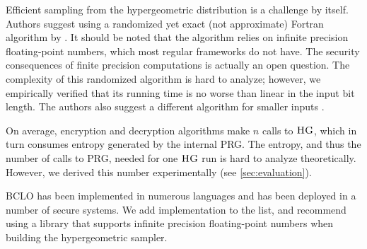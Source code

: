 		Efficient sampling from the hypergeometric distribution is a challenge by itself.
		Authors suggest using a randomized yet exact (not approximate) Fortran algorithm by \textcite{hg-sampler}.
		It should be noted that the algorithm relies on infinite precision floating-point numbers, which most regular frameworks do not have.
		The security consequences of finite precision computations is actually an open question.
		The complexity of this randomized algorithm is hard to analyze; however, we empirically verified that its running time is no worse than linear in the input bit length.
		The authors also suggest a different algorithm for smaller inputs \cite{hg-sampler-small}.

		On average, encryption and decryption algorithms make $n$ calls to $\textsc{HG}$, which in turn consumes entropy generated by the internal PRG\@.
		The entropy, and thus the number of calls to PRG, needed for one $\textsc{HG}$ run is hard to analyze theoretically.
		However, we derived this number experimentally (see \cref{sec:evaluation}).

		BCLO has been implemented in numerous languages and has been deployed in a number of secure systems.
		We add {\Csharp} implementation to the list, and recommend using a library that supports infinite precision floating-point numbers when building the hypergeometric sampler.
